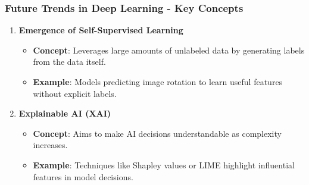 \documentclass[aspectratio=169]{beamer}
\begin{document}
\begin{frame}[fragile]
    \frametitle{Future Trends in Deep Learning - Key Concepts}
    \begin{enumerate}
        \item \textbf{Emergence of Self-Supervised Learning}
            \begin{itemize}
                \item \textbf{Concept}: Leverages large amounts of unlabeled data by generating labels from the data itself.
                \item \textbf{Example}: Models predicting image rotation to learn useful features without explicit labels.
            \end{itemize}

        \item \textbf{Explainable AI (XAI)}
            \begin{itemize}
                \item \textbf{Concept}: Aims to make AI decisions understandable as complexity increases.
                \item \textbf{Example}: Techniques like Shapley values or LIME highlight influential features in model decisions.
            \end{itemize}
    \end{enumerate}
\end{frame}
\end{document}
